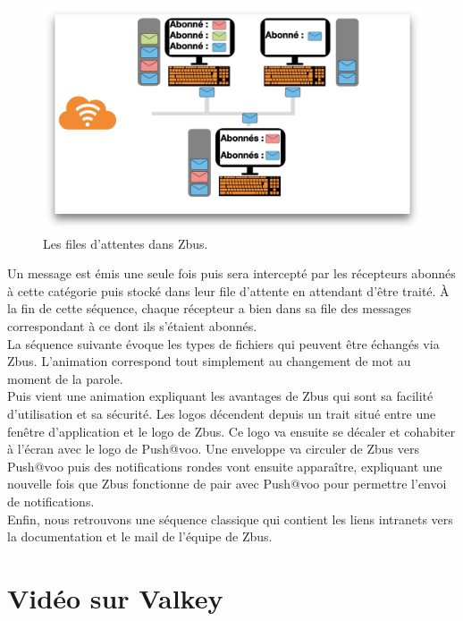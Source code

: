 \begin{figure}[htp]
  \centering
  \includegraphics[width=15cm]{images/zbus/screensbus.png}
  \caption{Les files d'attentes dans Zbus.}
  \label{screenzbus}
\end{figure}


Un message est émis une seule fois puis sera intercepté par les récepteurs abonnés à cette catégorie puis stocké dans leur file d'attente en attendant d'être traité. À la fin de cette séquence, chaque récepteur a bien dans sa file des messages correspondant à ce dont ils s'étaient abonnés.\\

La séquence suivante évoque les types de fichiers qui peuvent être échangés via Zbus. L'animation correspond tout simplement au changement de mot au moment de la parole.\\

Puis vient une animation expliquant les avantages de Zbus qui sont sa facilité d'utilisation et sa sécurité. Les logos décendent depuis un trait situé entre une fenêtre d'application et le logo de Zbus. Ce logo va ensuite se décaler et cohabiter à l'écran avec le logo de Push@voo. Une enveloppe va circuler de Zbus vers Push@voo puis des notifications rondes vont ensuite apparaître, expliquant une nouvelle fois que Zbus fonctionne de pair avec Push@voo pour permettre l'envoi de notifications.\\

Enfin, nous retrouvons une séquence classique qui contient les liens intranets vers la documentation et le mail de l'équipe de Zbus.


\section{Vidéo sur Valkey}

